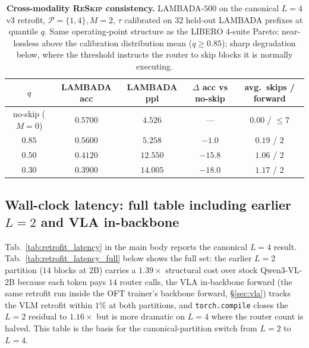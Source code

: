 \documentclass{article}
\newcommand{\reskip}{\textsc{ReSkip}}
\begin{document}
\begin{table}[h]
\caption{\textbf{Cross-modality \reskip{} consistency.} LAMBADA-$500$ on the canonical $L{=}4$ v3 retrofit, $\mathcal{P}{=}\{1,4\}, M{=}2$, $\tau$ calibrated on $32$ held-out LAMBADA prefixes at quantile $q$. Same operating-point structure as the LIBERO 4-suite Pareto: near-lossless above the calibration distribution mean ($q{\geq}0.85$); sharp degradation below, where the threshold instructs the router to skip blocks it is normally executing.}
\label{tab:retrofit_pareto}
\centering\small
\begin{tabular}{ccccc}
\toprule
$q$ & LAMBADA acc & LAMBADA ppl & $\Delta$ acc vs no-skip & avg.\ skips / forward \\
\midrule
no-skip ($M{=}0$) & $0.5700$ & $4.526$ & --- & $0.00$ / $\le 7$ \\
$0.85$ & $0.5600$ & $5.258$ & $-1.0$ & $0.19$ / $2$ \\
$0.50$ & $0.4120$ & $12.550$ & $-15.8$ & $1.06$ / $2$ \\
$0.30$ & $0.3900$ & $14.005$ & $-18.0$ & $1.17$ / $2$ \\
\bottomrule
\end{tabular}
\end{table}

\subsection{\texorpdfstring{Wall-clock latency: full table including earlier $L{=}2$ and VLA in-backbone}{Wall-clock latency: full table including earlier L=2 and VLA in-backbone}}
\label{app:latency}
Tab.~\ref{tab:retrofit_latency} in the main body reports the canonical $L{=}4$ result. Tab.~\ref{tab:retrofit_latency_full} below shows the full set: the earlier $L{=}2$ partition ($14$ blocks at $2$B) carries a $1.39\times$ structural cost over stock Qwen3-VL-2B because each token pays $14$ router calls, the VLA in-backbone forward (the same retrofit run inside the OFT trainer's backbone forward, \S\ref{sec:vla}) tracks the VLM retrofit within $1\%$ at both partitions, and \texttt{torch.compile} closes the $L{=}2$ residual to $1.16\times$ but is more dramatic on $L{=}4$ where the router count is halved. This table is the basis for the canonical-partition switch from $L{=}2$ to $L{=}4$.
\end{document}
